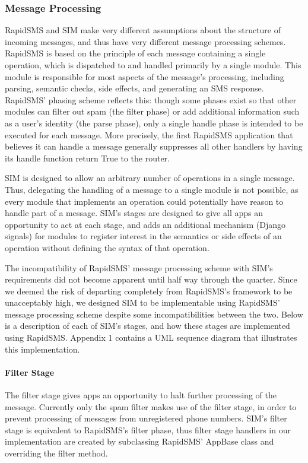 \documentclass{acm_proc_article-sp}
\begin{document}
\subsubsection{Message Processing}

RapidSMS and SIM make very different assumptions about the structure of incoming messages, and thus have very different message processing schemes. RapidSMS is based on the principle of each message containing a single operation, which is dispatched to and handled primarily by a single module. This module is responsible for most aspects of the message's processing, including parsing, semantic checks, side effects, and generating an SMS response. RapidSMS' phasing scheme reflects this: though some phases exist so that other modules can filter out spam (the filter phase) or add additional information such as a user's identity (the parse phase), only a single handle phase is intended to be executed for each message. More precisely, the first RapidSMS application that believes it can handle a message generally suppresses all other handlers by having its handle function return True to the router.

SIM is designed to allow an arbitrary number of operations in a single message. Thus, delegating the handling of a message to a single module is not possible, as every module that implements an operation could potentially have reason to handle part of a message. SIM's stages are designed to give all apps an opportunity to act at each stage, and adds an additional mechanism (Django signals) for modules to register interest in the semantics or side effects of an operation without defining the syntax of that operation.

The incompatibility of RapidSMS' message processing scheme with SIM's requirements did not become apparent until half way through the quarter. Since we deemed the risk of departing completely from RapidSMS's framework to be unacceptably high, we designed SIM to be implementable using RapidSMS' message processing scheme despite some incompatibilities between the two. Below is a description of each of SIM's stages, and how these stages are implemented using RapidSMS. Appendix 1 contains a UML sequence diagram that illustrates this implementation.

\paragraph{Filter Stage}

The filter stage gives apps an opportunity to halt further processing of the message. Currently only the spam filter makes use of the filter stage, in order to prevent processing of messages from unregistered phone numbers. SIM's filter stage is equivalent to RapidSMS's filter phase, thus filter stage handlers in our implementation are created by subclassing RapidSMS' AppBase class and overriding the filter method.
\end{document}
